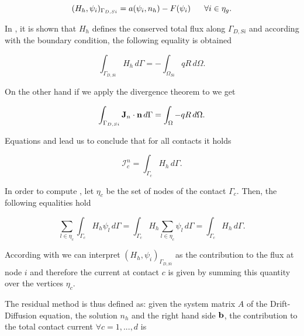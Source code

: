 \begin{equation}
\label{eq: flux problem complete}
(H_h,\psi_i)_{\Gamma_{D,Si}} = a(\psi_i,n_h)-F(\psi_i) \psp{10} \forall i \in \eta_g .
\end{equation} 


In \cite{GalerkMethConsHughes}, it is shown that $H_h$ defines the conserved total flux along $\Gamma_{D,Si}$ and according with the boundary condition, the following equality is obtained

\begin{equation}
\label{eq: conservative flux}
\int_{\Gamma_{D,Si}} H_h \, d\Gamma = - \int_{\Omega_{Si}} qR \, d \Omega.
\end{equation}


On the other hand if we apply the divergence theorem to  we get

\begin{equation}
\label{eq: lec divergence theor}
\int_{\Gamma_{D,Si}} \mathbf{J}_n \cdot \mathbf{n} \, d\Gamma = \int_{\Omega} - qR \, d\Omega.
\end{equation}

Equations  and   lead us to conclude that for all contacts it holds

\begin{equation}
\label{eq: flux current formula}
\mathcal{I}_c^n = \int_{\Gamma_c} H_h \, d\Gamma.
\end{equation}

In order to compute , let $\eta_{c}$ be the set of nodes of the contact $\Gamma_c$. Then, the following equalities hold

\begin{equation}
\label{eq: equalities integrals}
\sum_{l \in \eta_c} \int_{\Gamma_c} H_h \psi_l \, d\Gamma 
=  \int_{\Gamma_c} H_h \sum_{l \in \eta_{c}} \psi_l \,d\Gamma 
= \int_{\Gamma_c} H_h \, d\Gamma.
\end{equation}


According with   we can interpret $(H_h,\psi_i)_{\Gamma_{D,Si}}$ as the contribution to the flux at node $i$ and therefore the current at contact $c$ is given by summing this quantity  over the vertices $\eta_{c}$.

The residual method is thus defined as:
given the system matrix $A$ of the Drift-Diffusion equation, the solution $n_h$ and the right hand side $\mathbf{b}$, the contribution to the total contact current $\forall c = 1,...,d$ is

